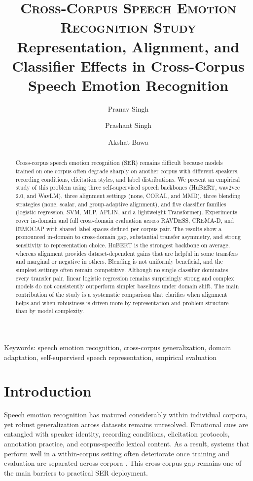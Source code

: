 ﻿\documentclass[10pt,twocolumn,letterpaper]{article}
\title{
\usefont{OT1}{bch}{b}{n}
\normalfont \normalsize \textsc{Cross-Corpus Speech Emotion Recognition Study} \\ [8pt]
\huge Representation, Alignment, and Classifier Effects in Cross-Corpus Speech Emotion Recognition \\
}
\author[1]{Pranav Singh}
\author[1]{Prashant Singh}
\author[1]{Akshat Bawa}
\affil[1]{\small Indian Institute of Technology (IIT), Ropar}
\date{}
\begin{document}
\maketitle

\begin{abstract}
Cross-corpus speech emotion recognition (SER) remains difficult because models trained on one corpus often degrade sharply on another corpus with different speakers, recording conditions, elicitation styles, and label distributions. We present an empirical study of this problem using three self-supervised speech backbones (HuBERT, wav2vec 2.0, and WavLM), three alignment settings (none, CORAL, and MMD), three blending strategies (none, scalar, and group-adaptive alignment), and five classifier families (logistic regression, SVM, MLP, APLIN, and a lightweight Transformer). Experiments cover in-domain and full cross-domain evaluation across RAVDESS, CREMA-D, and IEMOCAP with shared label spaces defined per corpus pair. The results show a pronounced in-domain to cross-domain gap, substantial transfer asymmetry, and strong sensitivity to representation choice. HuBERT is the strongest backbone on average, whereas alignment provides dataset-dependent gains that are helpful in some transfers and marginal or negative in others. Blending is not uniformly beneficial, and the simplest settings often remain competitive. Although no single classifier dominates every transfer pair, linear logistic regression remains surprisingly strong and complex models do not consistently outperform simpler baselines under domain shift. The main contribution of the study is a systematic comparison that clarifies when alignment helps and when robustness is driven more by representation and problem structure than by model complexity.
\end{abstract}

\noindent
Keywords: speech emotion recognition, cross-corpus generalization, domain adaptation, self-supervised speech representation, empirical evaluation

\section{Introduction}
Speech emotion recognition has matured considerably within individual corpora, yet robust generalization across datasets remains unresolved. Emotional cues are entangled with speaker identity, recording conditions, elicitation protocols, annotation practice, and corpus-specific lexical content. As a result, systems that perform well in a within-corpus setting often deteriorate once training and evaluation are separated across corpora \cite{schuller2010cross}. This cross-corpus gap remains one of the main barriers to practical SER deployment.
\end{document}
